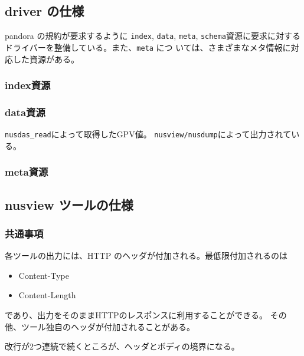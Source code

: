 \subsection{driver の仕様}
pandora の規約が要求するように {\tt index}, {\tt data}, {\tt meta}, 
{\tt schema}資源に要求に対するドライバーを整備している。また、{\tt meta} につ
いては、さまざまなメタ情報に対応した資源がある。
\subsubsection{index資源}
\subsubsection{data資源}
\verb|nusdas_read|によって取得したGPV値。
\verb|nusview/nusdump|によって出力されている。

\subsubsection{meta資源}


\subsection{nusview ツールの仕様}
\label{nusview}
\subsubsection{共通事項}
各ツールの出力には、HTTP のヘッダが付加される。最低限付加されるのは
\begin{itemize}
\item Content-Type
\item Content-Length
\end{itemize}
であり、出力をそのままHTTPのレスポンスに利用することができる。
その他、ツール独自のヘッダが付加されることがある。

改行が2つ連続で続くところが、ヘッダとボディの境界になる。
